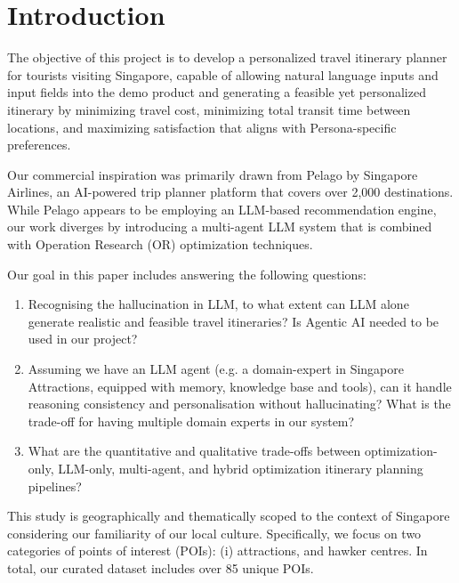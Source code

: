 \documentclass{ecai}
\begin{document}

\section{Introduction}
The objective of this project is to develop a personalized travel itinerary planner for tourists visiting Singapore, capable of allowing natural language inputs and input fields into the demo product and generating a feasible yet personalized itinerary by minimizing travel cost, minimizing total transit time between locations, and maximizing satisfaction that aligns with Persona-specific preferences.

Our commercial inspiration was primarily drawn from Pelago by Singapore Airlines, an AI-powered trip planner platform that covers over 2,000 destinations. While Pelago appears to be employing an LLM-based recommendation engine, our work diverges by introducing a multi-agent LLM system that is combined with Operation Research (OR) optimization techniques.

Our goal in this paper includes answering the following questions: 
\begin{enumerate}
    \item Recognising the hallucination in LLM, to what extent can LLM alone generate realistic and feasible travel itineraries? Is Agentic AI needed to be used in our project?
    \item Assuming we have an LLM agent (e.g. a domain-expert in Singapore Attractions, equipped with memory, knowledge base and tools), can it handle reasoning consistency and personalisation without hallucinating? What is the trade-off for having multiple domain experts in our system?
    \item What are the quantitative and qualitative trade-offs between optimization-only, LLM-only, multi-agent, and hybrid optimization itinerary planning pipelines?
\end{enumerate}

This study is geographically and thematically scoped to the context of Singapore considering our familiarity of our local culture. Specifically, we focus on two categories of points of interest (POIs): (i) attractions, and hawker centres. In total, our curated dataset includes over 85 unique POIs.

\end{document}

